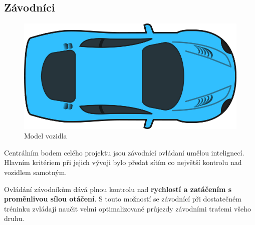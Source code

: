 \documentclass[a4paper,12pt]{article}
\begin{document}
        \subsection{Závodníci}
            \hfill
            \vspace{-2em}
            \begin{figure}
                \centering
                \includegraphics[width=0.7\linewidth]{../data/carClipArt.jpg}
                \caption{Model vozidla \cite{c:carmodel}} 
                \label{fig:carpic}
            \end{figure}

            Centrálním bodem celého projektu jsou závodnící ovládaní umělou intelignecí.
            Hlavním kritériem při jejich vývoji bylo předat sítím co největší kontrolu nad 
            vozidlem samotným. 

            \vspace{2em}
            \begin{figure}[H]
            \centering
            \begin{minipage}[t]{.5\textwidth}
                \centering
            \end{minipage}%
            \begin{minipage}[t]{.5\textwidth}
                \centering
            \end{minipage}
            \label{fig:controlls}
            \end{figure}

            Ovládání závodníkům dává plnou kontrolu nad \textbf{rychlostí a zatáčením s proměnlivou
            sílou otáčení}. S touto možností se závodnící při dostatečném tréninku zvládají naučit
            velmi optimalizované průjezdy závodními traťemi všeho druhu.
\end{document}
